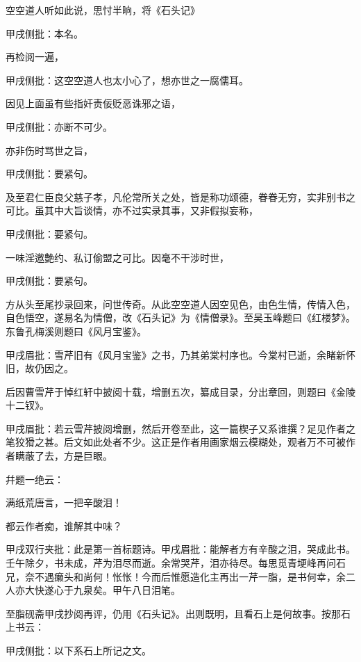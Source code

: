 \begin{parag}
    空空道人听如此说，思忖半晌，将《石头记》\begin{note}甲戌侧批：本名。\end{note}再检阅一遍，\begin{note}甲戌侧批：这空空道人也太小心了，想亦世之一腐儒耳。\end{note}因见上面虽有些指奸责佞贬恶诛邪之语，\begin{note}甲戌侧批：亦断不可少。\end{note}亦非伤时骂世之旨，\begin{note}甲戌侧批：要紧句。\end{note}及至君仁臣良父慈子孝，凡伦常所关之处，皆是称功颂德，眷眷无穷，实非别书之可比。虽其中大旨谈情，亦不过实录其事，又非假拟妄称，\begin{note}甲戌侧批：要紧句。\end{note}一味淫邀艶约、私订偷盟之可比。因毫不干涉时世，\begin{note}甲戌侧批：要紧句。\end{note}方从头至尾抄录回来，问世传奇。从此空空道人因空见色，由色生情，传情入色，自色悟空，遂易名为情僧，改《石头记》为《情僧录》。至吴玉峰题曰《红楼梦》。东鲁孔梅溪则题曰《风月宝鉴》。\begin{note}甲戌眉批：雪芹旧有《风月宝鉴》之书，乃其弟棠村序也。今棠村已逝，余睹新怀旧，故仍因之。\end{note}后因曹雪芹于悼红轩中披阅十载，增删五次，纂成目录，分出章回，则题曰《金陵十二钗》。\begin{note}甲戌眉批：若云雪芹披阅增删，然后开卷至此，这一篇楔子又系谁撰？足见作者之笔狡猾之甚。后文如此处者不少。这正是作者用画家烟云模糊处，观者万不可被作者瞒蔽了去，方是巨眼。\end{note}幷题一绝云：
\end{parag}


\begin{poem}
    \begin{pl}
        满纸荒唐言，一把辛酸泪！\end{pl}

    \begin{pl}
        都云作者痴，谁解其中味？\end{pl}
    \begin{note}甲戌双行夹批：此是第一首标题诗。甲戌眉批：能解者方有辛酸之泪，哭成此书。壬午除夕，书未成，芹为泪尽而逝。余常哭芹，泪亦待尽。每思觅青埂峰再问石兄，奈不遇癞头和尚何！怅怅！今而后惟愿造化主再出一芹一脂，是书何幸，余二人亦大快遂心于九泉矣。甲午八日泪笔。\end{note}
\end{poem}
\begin{parag}
    至脂砚斋甲戌抄阅再评，仍用《石头记》。出则既明，且看石上是何故事。按那石上书云：\begin{note}甲戌侧批：以下系石上所记之文。\end{note}
\end{parag}


